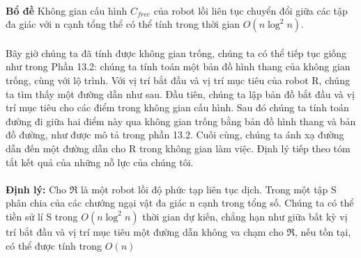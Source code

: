 \documentclass[a4paper,12pt]{report}
\begin{document}
\\
\textbf{Bổ đề } Không gian cấu hình $C_{free}$ của robot lồi liên tục chuyển đổi giữa các tập đa giác với n cạnh tổng thể có thể tính trong thời gian $O(n\log^2n)$. \\ \\
Bây giờ chúng ta đã tính được không gian trống, chúng ta có thể tiếp tục giống như trong Phần 13.2: chúng ta tính toán một bản đồ hình thang của không gian trống, cùng với lộ trình. Với vị trí bắt đầu và vị trí mục tiêu của robot R, chúng ta tìm thấy một đường dẫn như sau. Đầu tiên, chúng ta lập bản đồ bắt đầu và vị trí mục tiêu cho các điểm trong không gian cấu hình. Sau đó chúng ta tính toán đường đi giữa hai điểm này qua không gian trống bằng bản đồ hình thang và bản đồ đường, như được mô tả trong phần 13.2. Cuối cùng, chúng ta ánh xạ đường dẫn đến một đường dẫn cho R trong không gian làm việc. Định lý tiếp theo tóm tắt kết quả của những nỗ lực của chúng tôi. \\ \\ 
\textbf{Định lý: } Cho $\Re$ là một robot lồi độ phức tạp liên tục dịch. Trong một tập S phân chia của các chướng ngại vật đa giác n cạnh trong tổng số. Chúng ta có thể tiền sử lí S trong $O (n\log^2n)$ thời gian dự kiến, chẳng hạn như giữa bất kỳ vị trí bắt đầu và vị trí mục tiêu một đường dẫn không va chạm cho $\Re$, nếu tồn tại, có thể được tính trong $O(n)$
\begin{thebibliography}{9} 

\end{thebibliography}
\end{document}
